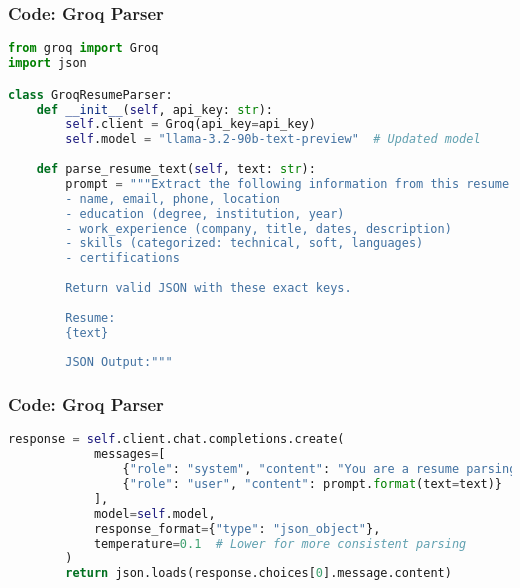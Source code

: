 \begin{frame}[fragile]\frametitle{Code: Groq Parser}
    \begin{lstlisting}[language=Python, basicstyle=\tiny, caption={llm\_parsing\_groq.py}]
from groq import Groq
import json

class GroqResumeParser:
    def __init__(self, api_key: str):
        self.client = Groq(api_key=api_key)
        self.model = "llama-3.2-90b-text-preview"  # Updated model
    
    def parse_resume_text(self, text: str):
        prompt = """Extract the following information from this resume:
        - name, email, phone, location
        - education (degree, institution, year)
        - work_experience (company, title, dates, description)
        - skills (categorized: technical, soft, languages)
        - certifications
        
        Return valid JSON with these exact keys.
        
        Resume:
        {text}
        
        JSON Output:"""

    \end{lstlisting}
\end{frame}

\begin{frame}[fragile]\frametitle{Code: Groq Parser}
    \begin{lstlisting}[language=Python, basicstyle=\tiny, caption={llm\_parsing\_groq.py}]
        response = self.client.chat.completions.create(
            messages=[
                {"role": "system", "content": "You are a resume parsing expert. Output only valid JSON."},
                {"role": "user", "content": prompt.format(text=text)}
            ],
            model=self.model,
            response_format={"type": "json_object"},
            temperature=0.1  # Lower for more consistent parsing
        )
        return json.loads(response.choices[0].message.content)
    \end{lstlisting}
\end{frame}

